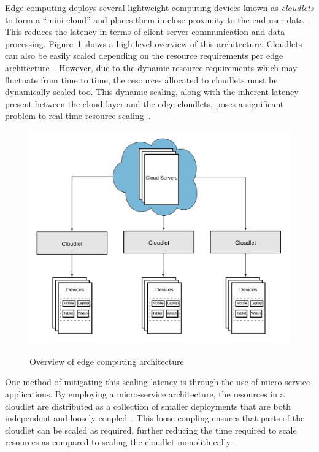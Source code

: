 Edge computing deploys several lightweight computing devices known as \textit{cloudlets} to form a ``mini-cloud'' and places them in close proximity to the end-user data~\cite{liu2019survey}. This reduces the latency in terms of client-server communication and data processing. Figure~\ref{fig:edge-architecture-overview} shows a high-level overview of this architecture. Cloudlets can also be easily scaled depending on the resource requirements per edge architecture~\cite{ren2019survey}. However, due to the dynamic resource requirements which may fluctuate from time to time, the resources allocated to cloudlets must be dynamically scaled too. This dynamic scaling, along with the inherent latency present between the cloud layer and the edge cloudlets, poses a significant problem to real-time resource scaling~\cite{varghese2016challenges}.\par

\begin{figure}[htb]
    \centering
    \caption{Overview of edge computing architecture}
    \includegraphics[width=0.9\linewidth]{Figures/Edge-Architecture-Overview.pdf}
    \label{fig:edge-architecture-overview}
\end{figure}

One method of mitigating this scaling latency is through the use of micro-service applications. By employing a micro-service architecture, the resources in a cloudlet are distributed as a collection of smaller deployments that are both independent and loosely coupled~\cite{villamizar2015evaluating}. This loose coupling ensures that parts of the cloudlet can be scaled as required, further reducing the time required to scale resources as compared to scaling the cloudlet monolithically.\par

